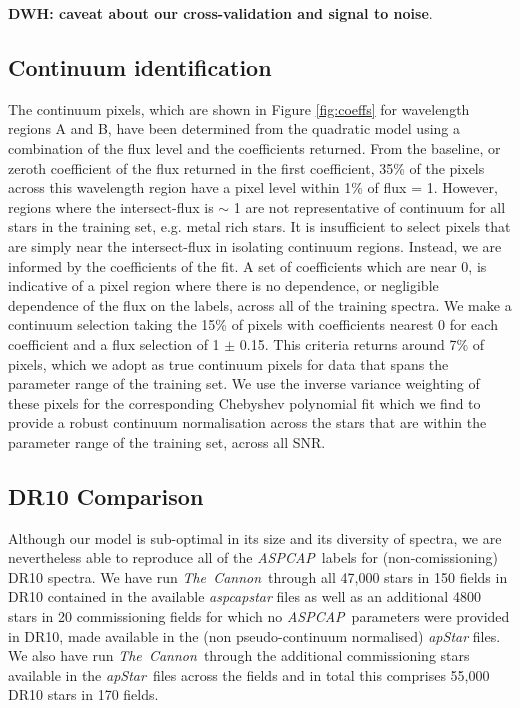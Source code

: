 \documentclass[12pt, preprint]{aastex}
\newcommand{\tc}{\textsl{The~Cannon}}
\newcommand{\apogee}{\textsl{APOGEE}}
\newcommand{\aspcap}{\textsl{ASPCAP}}
\newcommand{\apstar}{\textsl{apStar}}
\begin{document}
\textbf{DWH: caveat about our cross-validation and signal to noise}. 

\subsection{Continuum identification}

The continuum pixels, which are shown in Figure \ref{fig:coeffs} for wavelength regions A and B,  have been determined from the quadratic model using a combination of the flux level and the coefficients returned.  From the baseline, or zeroth coefficient of the flux returned in the first coefficient, 35\% of the pixels across this wavelength region have a pixel level within 1\% of flux = 1. However, regions where the intersect-flux is $\sim$ 1 are not representative of continuum for all stars in the training set, e.g. metal rich stars. It is insufficient to select pixels that are simply near the intersect-flux in isolating continuum regions. Instead, we are informed by the coefficients of the fit. A set of coefficients which are near 0, is indicative of a pixel region where there is no dependence, or negligible dependence of the flux on the labels, across all of the training spectra. We make a continuum selection taking the 15\% of pixels with coefficients nearest 0 for each coefficient and a flux selection of 1 $\pm$ 0.15. This criteria returns around  7\% of pixels, which we adopt as true continuum pixels for data that spans the parameter range of the training set. We use the inverse variance weighting of these pixels for the corresponding Chebyshev polynomial fit which we find to provide a robust continuum normalisation across the stars that are within the parameter range of the training set, across all SNR. 

\subsection{DR10 Comparison}

Although our model is sub-optimal in its size and its diversity of spectra, we are nevertheless able to reproduce all of the \aspcap\ labels for (non-comissioning) DR10 spectra. We have run \tc\ through all 47,000 stars in 150 fields in DR10 contained in the available \textit{aspcapstar} files as well as an additional 4800 stars in 20 commissioning fields for which no \aspcap\ parameters were provided in DR10, made available in the (non pseudo-continuum normalised) \textit{apStar} files. We also have run \tc\ through the additional commissioning stars available in the \apstar\ files across the fields and in total this comprises 55,000 DR10 stars in 170 fields. %
\end{document}

